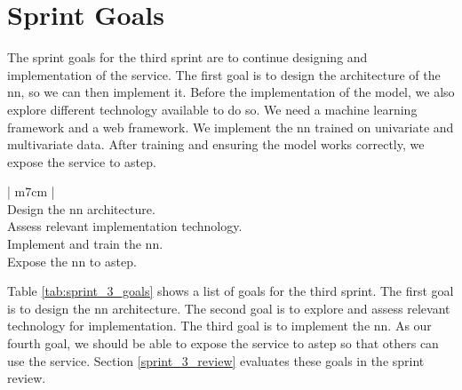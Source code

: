 \section{Sprint Goals}
The sprint goals for the third sprint are to continue designing and implementation of the service. The first goal is to design the architecture of the \gls{nn}, so we can then implement it. Before the implementation of the model, we also explore different technology available to do so. We need a machine learning framework and a web framework. We implement the \gls{nn} trained on univariate and multivariate data. After training and ensuring the model works correctly, we expose the service to \gls{astep}.\newline

\bgroup
\def\arraystretch{1.8}
\begin{table}[htbp]
    \centering
    \begin{tabular}{| m{7cm} |}
        \hline
         \\
        \hline
        Design the \gls{nn} architecture. \\
        \hline
        Assess relevant implementation technology. \\
        \hline
        Implement and train the \gls{nn}. \\
        \hline
        Expose the \gls{nn} to \gls{astep}. \\
        \hline
    \end{tabular}
    \caption{The third sprint goals.}
    \label{tab:sprint_3_goals}
\end{table}
\egroup

\noindent
Table \ref{tab:sprint_3_goals} shows a list of goals for the third sprint. The first goal is to design the \gls{nn} architecture. The second goal is to explore and assess relevant technology for implementation. The third goal is to implement the \gls{nn}. As our fourth goal, we should be able to expose the service to \gls{astep} so that others can use the service. Section \ref{sprint_3_review} evaluates these goals in the sprint review.
